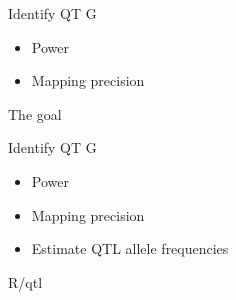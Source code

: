 \documentclass[12pt]{article}
\newcommand{\headsize}{\fontsize{35}{35} \selectfont}
\newcommand{\smallsize}{\fontsize{25}{30} \selectfont}
\begin{document}
{\vspace{25mm}

\color{mywhite}
\smallsize

\hfill \begin{minipage}{9.5in}
Identify QT{\color{mypink} G}
\end{minipage}

\vspace{15mm}

\hfill \begin{minipage}{9in}
\color{myblue}
\begin{itemize}
\itemsep24pt
\item Power
\item Mapping precision
\end{itemize}
\end{minipage}




\newpage

\addtocounter{page}{-1}

\headsize \color{myyellow}
\hfill \begin{minipage}{6.25in}
\centering
The goal
\end{minipage}

\vspace{25mm}

\color{mywhite}
\smallsize

\hfill \begin{minipage}{9.5in}
Identify QT{\color{mypink} G}
\end{minipage}

\vspace{15mm}

\hfill \begin{minipage}{9in}
\color{myblue}
\begin{itemize}
\itemsep24pt
\item Power
\item Mapping precision
\item Estimate QTL allele frequencies
\end{itemize}
\end{minipage}




\newpage


\headsize \color{myyellow}
\hfill \begin{minipage}{5.75in}
\centering
R/qtl
\end{minipage}

}
\end{document}
